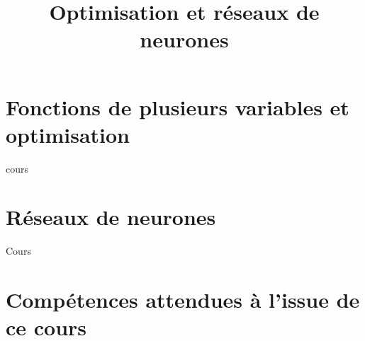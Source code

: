 \documentclass[fleqn,a4paper,11pt]{book}
\title{Optimisation et réseaux de neurones}
\begin{document}
\maketitle
\tableofcontents
\newpage

\newcommand{\myscale}{1}
\newcommand{\couleurnb}[2]{#2}
\newcommand{\mybox}[1]{\begin{center}\tikz{\node[block]{#1};}\end{center}}

\chapter{Fonctions de plusieurs variables et optimisation}

{cours}

\newpage

\chapter{Réseaux de neurones}
{Cours}

\newpage



\appendix
\chapter{Compétences attendues à l'issue de ce cours}

\end{document}
